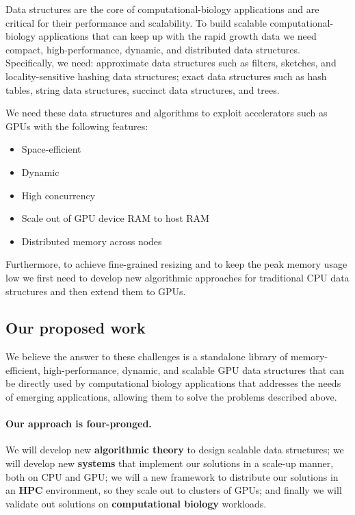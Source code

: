 Data structures are the core of computational-biology applications and are critical for their performance and scalability.
To build scalable computational-biology applications that can keep up with the rapid growth data we need compact, high-performance, dynamic, and distributed data structures. Specifically, we need: approximate data structures such as filters, sketches, and locality-sensitive hashing data structures; exact data structures such as hash tables, string data structures, succinct data structures, and trees.

We need these data structures and algorithms to exploit accelerators such as GPUs with the following features:
\begin{itemize}[noitemsep, leftmargin=*]
    \item Space-efficient
    \item Dynamic
    \item High concurrency
    \item Scale out of GPU device RAM to host RAM
    \item Distributed memory across nodes
\end{itemize}

Furthermore, to achieve fine-grained resizing and to keep the peak memory usage low we first need to develop new algorithmic approaches for traditional CPU data structures and then extend them to GPUs.

\subsection{Our proposed work}

We believe the answer to these challenges is a standalone library of memory-efficient, high-performance, dynamic, and scalable GPU data structures that can be directly used by computational biology applications that addresses the needs of emerging applications, allowing them to solve the problems described above.

\paragraph{Our approach is four-pronged.}  We will develop new \textbf{algorithmic theory} to design scalable data structures; we will develop new \textbf{systems} that implement our solutions in a scale-up manner,  both on CPU and GPU; we will a new framework to distribute our solutions in an \textbf{HPC} environment, so they  scale out to clusters of GPUs; and finally we will validate out solutions on \textbf{computational biology} workloads.

